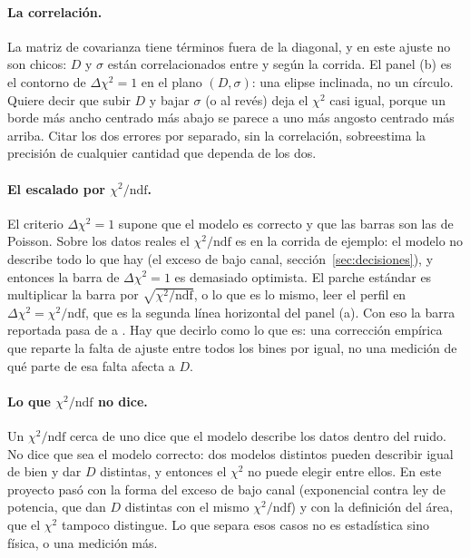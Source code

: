 \documentclass[11pt,a4paper]{article}
\begin{document}
\paragraph{La correlación.} La matriz de covarianza tiene términos fuera de
la diagonal, y en este ajuste no son chicos: $D$ y $\sigma$ están
correlacionados entre \CorrMin{} y \CorrMax{} según la corrida. El panel (b)
es el contorno de $\Delta\chi^2 = 1$ en el plano $(D, \sigma)$: una elipse
inclinada, no un círculo. Quiere decir que subir $D$ y bajar $\sigma$ (o al
revés) deja el $\chi^2$ casi igual, porque un borde más ancho centrado más
abajo se parece a uno más angosto centrado más arriba. Citar los dos errores
por separado, sin la correlación, sobreestima la precisión de cualquier
cantidad que dependa de los dos.

\paragraph{El escalado por $\chi^2/\text{ndf}$.} El criterio
$\Delta\chi^2 = 1$ supone que el modelo es correcto y que las barras son las
de Poisson. Sobre los datos reales el $\chi^2/\text{ndf}$ es \EjChiNdf{} en
la corrida de ejemplo: el modelo no describe todo lo que hay (el exceso de
bajo canal, sección~\ref{sec:decisiones}), y entonces la barra de
$\Delta\chi^2 = 1$ es demasiado optimista. El parche estándar es multiplicar
la barra por $\sqrt{\chi^2/\text{ndf}}$, o lo que es lo mismo, leer el perfil
en $\Delta\chi^2 = \chi^2/\text{ndf}$, que es la segunda línea horizontal del
panel (a). Con eso la barra reportada pasa de \EjErrCurv{} a
\EjErrEscalado{} \DkeV. Hay que decirlo como lo que es: una corrección
empírica que reparte la falta de ajuste entre todos los bines por igual, no
una medición de qué parte de esa falta afecta a $D$.

\paragraph{Lo que $\chi^2/\text{ndf}$ no dice.} Un $\chi^2/\text{ndf}$ cerca
de uno dice que el modelo describe los datos dentro del ruido. No dice que
sea el modelo correcto: dos modelos distintos pueden describir igual de bien
y dar $D$ distintas, y entonces el $\chi^2$ no puede elegir entre ellos. En
este proyecto pasó con la forma del exceso de bajo canal (exponencial contra
ley de potencia, que dan $D$ distintas con el mismo $\chi^2/\text{ndf}$) y
con la definición del área, que el $\chi^2$ tampoco
distingue. Lo que separa esos casos no es estadística sino física, o una
medición más.
\end{document}
